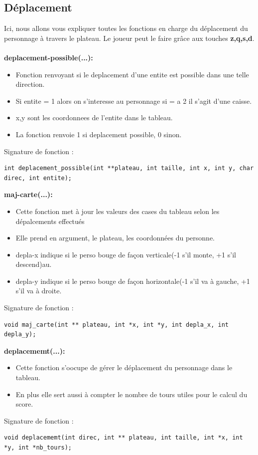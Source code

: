 \documentclass{article}
\begin{document}
\subsection{Déplacement}
Ici, nous allons vous expliquer toutes les fonctions en charge du déplacement du personnage à travers le plateau. Le joueur peut le faire grâce aux touches \textbf{z,q,s,d}.\\\\
\textbf{deplacement-possible(...):}
\begin{itemize}
\item Fonction renvoyant si le deplacement d'une entite est possible dans une telle direction.
\item Si entite = 1 alors on s'interesse au personnage si = a 2 il s'agit d'une caisse.
\item x,y sont les coordonnees de l'entite dans le tableau.
\item La fonction renvoie 1 si deplacement possible, 0 sinon.
\end{itemize}
Signature de fonction :
\begin{lstlisting}
int deplacement_possible(int **plateau, int taille, int x, int y, char direc, int entite);
\end{lstlisting}
\textbf{maj-carte(...):}
\begin{itemize}
\item Cette fonction met à jour les valeurs des cases du tableau selon les dépalcements effectués
\item Elle prend en argument, le plateau, les coordonnées du personne.
\item depla-x indique si le perso bouge de façon verticale(-1 s'il monte, +1 s'il descend)au.
\item depla-y indique si le perso bouge de façon horizontale(-1 s'il va à gauche, +1 s'il va à droite.
\end{itemize}
Signature de fonction :
\begin{lstlisting}
void maj_carte(int ** plateau, int *x, int *y, int depla_x, int depla_y);
\end{lstlisting}
\textbf{deplacememt(...):}
\begin{itemize}
\item Cette fonction s'oocupe de gérer le déplacement du personnage dans le tableau.
\item En plus elle sert aussi à compter le nombre de tours utiles pour le calcul du score.
\end{itemize}
Signature de fonction :
\begin{lstlisting}
void deplacememt(int direc, int ** plateau, int taille, int *x, int *y, int *nb_tours);
\end{lstlisting}
\end{document}

